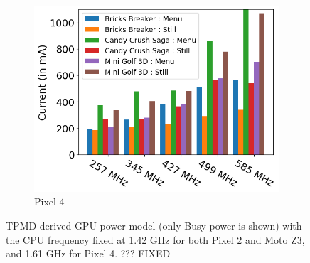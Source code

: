 \begin{figure}[tp]
\begin{subfigure}[b]{0.32\textwidth}
         \centering
         \includegraphics[width=\textwidth]{figures/004_Pixel4_gpu_model.png}
         \caption{Pixel 4}
         \label{fig:gpu_model_p4}
     \end{subfigure}
     \hfill
    \caption{TPMD-derived GPU power model (only Busy power is shown) with
        the CPU frequency fixed at 1.42 GHz for both Pixel 2 and Moto Z3,
        and 1.61 GHz for Pixel 4. ??? FIXED}
    \label{fig:gpu_model}
    \vspace{-0.1in}
\end{figure}


